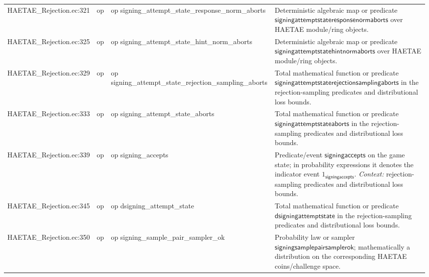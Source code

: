 \documentclass[10pt]{article}
\begin{document}
\begin{longtable}{L{0.11\textwidth}L{0.055\textwidth}L{0.385\textwidth}L{0.41\textwidth}}
HAETAE\_\allowbreak{}Rejection.\allowbreak{}ec:\allowbreak{}321 & op & {\ttfamily\scriptsize op signing\_\allowbreak{}attempt\_\allowbreak{}state\_\allowbreak{}response\_\allowbreak{}norm\_\allowbreak{}aborts} & Deterministic algebraic map or predicate $\mathsf{signingattemptstateresponsenormaborts}$ over HAETAE module/ring objects. \\
HAETAE\_\allowbreak{}Rejection.\allowbreak{}ec:\allowbreak{}325 & op & {\ttfamily\scriptsize op signing\_\allowbreak{}attempt\_\allowbreak{}state\_\allowbreak{}hint\_\allowbreak{}norm\_\allowbreak{}aborts} & Deterministic algebraic map or predicate $\mathsf{signingattemptstatehintnormaborts}$ over HAETAE module/ring objects. \\
HAETAE\_\allowbreak{}Rejection.\allowbreak{}ec:\allowbreak{}329 & op & {\ttfamily\scriptsize op signing\_\allowbreak{}attempt\_\allowbreak{}state\_\allowbreak{}rejection\_\allowbreak{}sampling\_\allowbreak{}aborts} & Total mathematical function or predicate $\mathsf{signingattemptstaterejectionsamplingaborts}$ in the rejection-sampling predicates and distributional loss bounds. \\
HAETAE\_\allowbreak{}Rejection.\allowbreak{}ec:\allowbreak{}333 & op & {\ttfamily\scriptsize op signing\_\allowbreak{}attempt\_\allowbreak{}state\_\allowbreak{}aborts} & Total mathematical function or predicate $\mathsf{signingattemptstateaborts}$ in the rejection-sampling predicates and distributional loss bounds. \\
HAETAE\_\allowbreak{}Rejection.\allowbreak{}ec:\allowbreak{}339 & op & {\ttfamily\scriptsize op signing\_\allowbreak{}accepts} & Predicate/event $\mathsf{signingaccepts}$ on the game state; in probability expressions it denotes the indicator event $1_{\mathsf{signingaccepts}}$. \emph{Context:} rejection-sampling predicates and distributional loss bounds. \\
HAETAE\_\allowbreak{}Rejection.\allowbreak{}ec:\allowbreak{}345 & op & {\ttfamily\scriptsize op dsigning\_\allowbreak{}attempt\_\allowbreak{}state} & Total mathematical function or predicate $\mathsf{dsigningattemptstate}$ in the rejection-sampling predicates and distributional loss bounds. \\
HAETAE\_\allowbreak{}Rejection.\allowbreak{}ec:\allowbreak{}350 & op & {\ttfamily\scriptsize op signing\_\allowbreak{}sample\_\allowbreak{}pair\_\allowbreak{}sampler\_\allowbreak{}ok} & Probability law or sampler $\mathsf{signingsamplepairsamplerok}$; mathematically a distribution on the corresponding HAETAE coins/challenge space. \\

\end{longtable}
\end{document}
